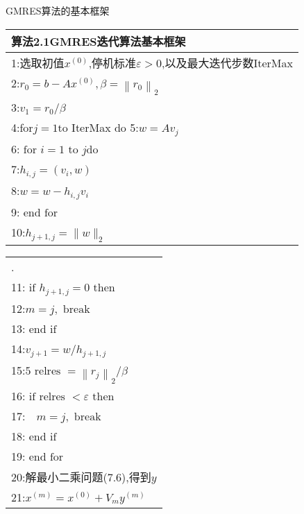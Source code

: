 \documentclass[notheorems,serif]{beamer}
\renewcommand{\normalsize}{\wuhao}
\newcommand{\wuhao}{\fontsize{10.5pt}{\baselineskip}\selectfont}
\begin{document}
\begin{frame}


{\color{blue}\Large GMRES算法的基本框架}

\quad

\normalsize
\begin{tabular}{l}
	\hline
	{\color{blue}算法2.1}GMRES迭代算法基本框架\\
	\hline
	1:选取初值$x^{(0)}$,停机标准$\varepsilon>0$,以及最大迭代步数IterMax\\
	2:$r_{0}=b-A x^{(0)}, \beta=\left\|r_{0}\right\|_{2}$\\
	3:$v_{1}=r_{0} / \beta$\\
	4:for$j= 1$to IterMax do
	5:\qquad $w=A v_{j}$ \\
	6:\qquad $\text { for } i=1 \text { to } j \mathrm{do}$ \qquad{\color{red}\% Arnoldi过程}\\ 
	7:\qquad \qquad $h_{i, j}=\left(v_{i}, w\right)$\\ 
	8:\qquad \qquad $w=w-h_{i, j} v_{i}$\\ 
	9:\qquad $\text { end for }$\\ 
	10:\qquad $h_{j+1, j}=\|w\|_{2}$\\ 
\end{tabular}
\end{frame}

\begin{frame}
\begin{tabular}{l}
\qquad \qquad \qquad \qquad \qquad \qquad \qquad \qquad \qquad \qquad \qquad \qquad \qquad .\\
	11:\qquad $\text { if } h_{j+1, j}=0 \text { then }$\\ 
	12:\qquad \qquad $m=j, \text { break }$\\
	13:\qquad $\text { end if }$\\ 
	14:\qquad $v_{j+1}=w / h_{j+1, j}$\\ 
	15:\qquad $5\text { relres }=\left\|r_{j}\right\|_{2} / \beta$\\ 
	16:\qquad $\text { if relres }<\varepsilon \text { then }$\\ 
	17:\qquad \qquad $\quad m=j, \text { break }$\\ 
	18:\qquad $\text { end if }$\\ 
	19:$\text { end for }$\\
	20:解最小二乘问题(7.6),得到$y$\\
	21:$x^{(m)}=x^{(0)}+V_{m} y^{(m)}$\\
	\hline
\end{tabular}
\end{frame}
\end{document}
